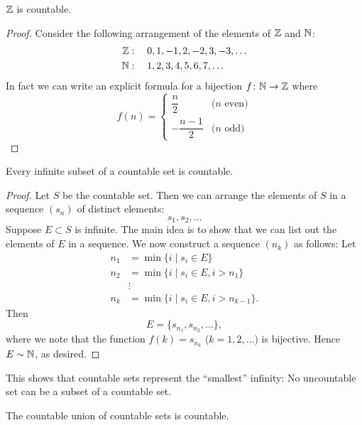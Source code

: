 \begin{example}
$\mathbb Z$ is countable.
\begin{proof}
Consider the following arrangement of the elements of $\mathbb Z$ and $\mathbb N$:
\begin{align*}
\mathbb Z&:\quad0,1,-1,2,-2,3,-3,\dots\\
\mathbb N&:\quad1,2,3,4,5,6,7,\dots
\end{align*}
In fact we can write an explicit formula for a bijection $f\colon \mathbb N\to\mathbb Z$ where
\[f(n)=\begin{cases}
\dfrac{n}{2}&\text{($n$ even)}\\[1ex]
-\dfrac{n-1}{2}&\text{($n$ odd)}
\end{cases}\]
\end{proof}
\end{example}

\begin{proposition}\label{prop:infinite-subset-countable}
Every infinite subset of a countable set is countable.
\end{proposition}

\begin{proof}
Let $S$ be the countable set. Then we can arrange the elements of $S$ in a sequence $(s_n)$ of distinct elements:
\[s_1,s_2,\dots\]
Suppose $E\subset S$ is infinite. The main idea is to show that we can list out the elements of $E$ in a sequence. We now construct a sequence $(n_k)$ as follows: Let
\begin{align*}
n_1&=\min\{i\mid s_i\in E\}\\
n_2&=\min\{i\mid s_i\in E,i>n_1\}\\
&\vdots\\
n_k&=\min\{i\mid s_i\in E,i>n_{k-1}\}.
\end{align*}
Then
\[E=\{s_{n_1},s_{n_2},\dots\},\]
where we note that the function $f(k)=s_{n_k}$ ($k=1,2,\dots$) is bijective. Hence $E\sim\mathbb N$, as desired.
\end{proof}

\begin{remark}
This shows that countable sets represent the ``smallest'' infinity: No uncountable set can be a subset of a countable set.
\end{remark}

\begin{proposition}\label{prop:union-countable}
The countable union of countable sets is countable.
\end{proposition}

